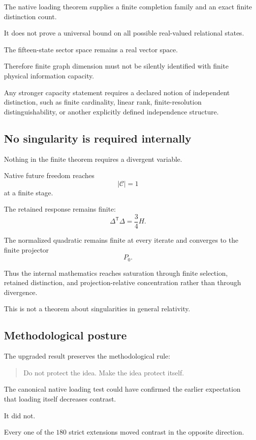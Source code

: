 The native loading theorem supplies a finite completion family and an
exact finite distinction count.

It does not prove a universal bound on all possible real-valued
relational states.

The fifteen-state sector space remains a real vector space.

Therefore finite graph dimension must not be silently identified with
finite physical information capacity.

Any stronger capacity statement requires a declared notion of
independent distinction, such as finite cardinality, linear rank,
finite-resolution distinguishability, or another explicitly defined
independence structure.

\subsection{No singularity is required internally}

Nothing in the finite theorem requires a divergent variable.

Native future freedom reaches
\[
|\mathcal C|=1
\]
at a finite stage.

The retained response remains finite:
\[
\Delta^{\mathsf T}\Delta=\frac34H.
\]

The normalized quadratic remains finite at every iterate and converges
to the finite projector
\[
P_0.
\]

Thus the internal mathematics reaches saturation through finite
selection, retained distinction, and projection-relative concentration
rather than through divergence.

This is not a theorem about singularities in general relativity.

\subsection{Methodological posture}

The upgraded result preserves the methodological rule:

\begin{quote}
Do not protect the idea. Make the idea protect itself.
\end{quote}

The canonical native loading test could have confirmed the earlier
expectation that loading itself decreases contrast.

It did not.

Every one of the \(180\) strict extensions moved contrast in the
opposite direction.

